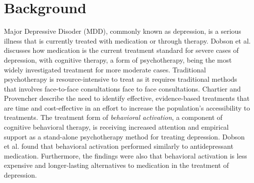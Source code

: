 \section{Background}


Major Depressive Disoder (MDD), commonly known as depression, is a serious illness that is currently treated with medication or through therapy. Dobson et al. \cite{randomized_trial_behavioural_activation} discusses how medication is the current treatment standard for severe cases of depression, with cognitive therapy, a form of psychotherapy, being the most widely investigated treatment for more moderate cases. Traditional psychotherapy is resource-intensive to treat as it requires traditional methods that involves face-to-face consultations face to face consultations. Chartier and Provencher \cite{behavioural_activation_for_depression} describe the need to identify effective, evidence-based treatments that are time and cost-effective in an effort to increase the population's accessibility to treatments. The treatment form of \textit{behavioral activation}, a component of cognitive behavioral therapy, is receiving increased attention and empirical support as a stand-alone psychotherapy method for treating depression. Dobson et al. found that behavioral activation performed similarly to antidepressant medication. Furthermore, the findings were also that behavioral activation is less expensive and longer-lasting alternatives to medication in the treatment of depression.  \\

